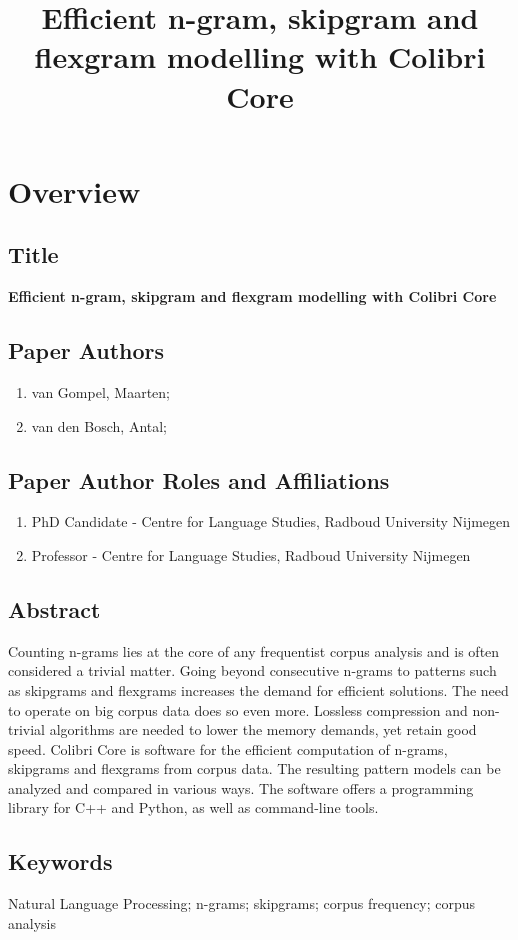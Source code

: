 \documentclass[a4paper,12pt]{article}
\title{Efficient n-gram, skipgram and flexgram modelling with Colibri Core}
\begin{document}
\section{Overview}

\subsection{Title}
\textbf{Efficient n-gram, skipgram and flexgram modelling with Colibri Core}

\subsection{Paper Authors}
\begin{enumerate}
    \item van Gompel, Maarten;
    \item van den Bosch, Antal;
\end{enumerate}

\subsection{Paper Author Roles and Affiliations}
\begin{enumerate}
    \item PhD Candidate - Centre for Language Studies, Radboud University Nijmegen
    \item Professor - Centre for Language Studies, Radboud University Nijmegen
\end{enumerate}

\subsection{Abstract}

Counting n-grams lies at the core of any frequentist corpus analysis and is
often considered a trivial matter. Going beyond consecutive n-grams to patterns
such as skipgrams and flexgrams increases the demand for efficient solutions.
The need to operate on big corpus data does so even more.  Lossless compression
and non-trivial algorithms are needed to lower the memory demands, yet retain
good speed. Colibri Core is software for the efficient computation of n-grams,
skipgrams and flexgrams from corpus data. The resulting pattern models can be
analyzed and compared in various ways. The software offers a programming
library for C++ and Python, as well as command-line tools.

\subsection{Keywords}
Natural Language Processing; n-grams; skipgrams; corpus frequency; corpus analysis
\end{document}
